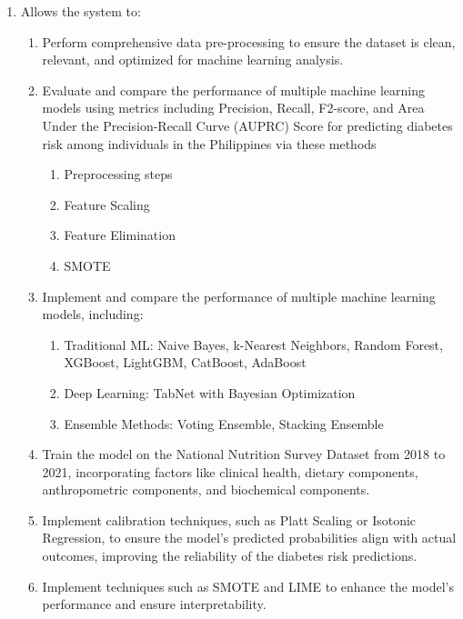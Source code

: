 \begin{enumerate}
    \item Allows the system to:
    \begin{enumerate}
        \item Perform comprehensive data pre-processing to ensure the dataset is clean, relevant, and optimized for machine learning analysis.
        \item Evaluate and compare the performance of multiple machine learning models using metrics including Precision, Recall, F2-score, and Area Under the Precision-Recall Curve (AUPRC) Score for predicting diabetes risk among individuals in the Philippines via these methods
        \begin{enumerate}
            \item Preprocessing steps
            \item Feature Scaling
            \item Feature Elimination
            \item SMOTE
        \end{enumerate}
        \item Implement and compare the performance of multiple machine learning models, including:
        \begin{enumerate}
            \item Traditional ML: Naive Bayes, k-Nearest Neighbors, Random Forest, XGBoost, LightGBM, CatBoost, AdaBoost
            \item Deep Learning: TabNet with Bayesian Optimization
            \item Ensemble Methods: Voting Ensemble, Stacking Ensemble
        \end{enumerate}
        \item Train the model on the National Nutrition Survey Dataset from 2018 to 2021, incorporating factors like clinical health, dietary components, anthropometric components, and biochemical components.
        \item Implement calibration techniques, such as Platt Scaling or Isotonic Regression, to ensure the model's predicted probabilities align with actual outcomes, improving the reliability of the diabetes risk predictions.
        \item Implement techniques such as SMOTE and LIME to enhance the model's performance and ensure interpretability.
    \end{enumerate}
    

\end{enumerate}

